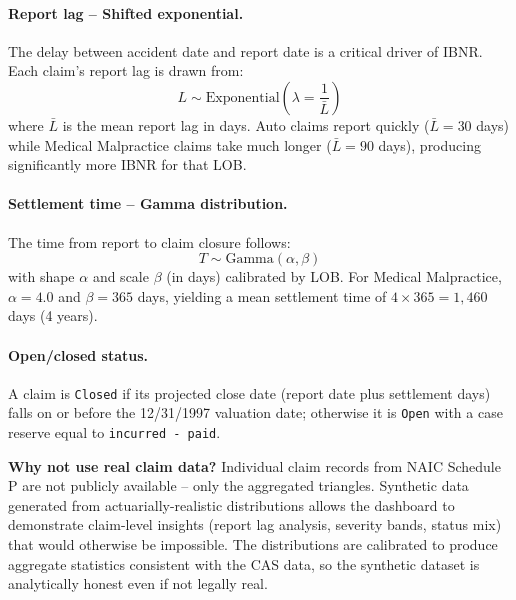 \paragraph{Report lag -- Shifted exponential.}
The delay between accident date and report date is a critical driver of IBNR.
Each claim's report lag is drawn from:
\begin{equation}
  L \sim \mathrm{Exponential}\!\left(\lambda = \frac{1}{\bar{L}}\right)
  \label{eq:report-lag}
\end{equation}
where $\bar{L}$ is the mean report lag in days.  Auto claims report quickly
($\bar{L} = 30$ days) while Medical Malpractice claims take much longer
($\bar{L} = 90$ days), producing significantly more IBNR for that LOB.

\paragraph{Settlement time -- Gamma distribution.}
The time from report to claim closure follows:
\begin{equation}
  T \sim \mathrm{Gamma}(\alpha, \beta)
  \label{eq:settlement-gamma}
\end{equation}
with shape $\alpha$ and scale $\beta$ (in days) calibrated by LOB.  For
Medical Malpractice, $\alpha = 4.0$ and $\beta = 365$ days, yielding a mean
settlement time of $4 \times 365 = 1{,}460$ days (4 years).

\paragraph{Open/closed status.}
A claim is \texttt{Closed} if its projected close date (report date plus
settlement days) falls on or before the 12/31/1997 valuation date; otherwise
it is \texttt{Open} with a case reserve equal to \texttt{incurred - paid}.

\begin{decisionbox}
\textbf{Why not use real claim data?}  Individual claim records from NAIC
Schedule P are not publicly available -- only the aggregated triangles.
Synthetic data generated from actuarially-realistic distributions allows the
dashboard to demonstrate claim-level insights (report lag analysis, severity
bands, status mix) that would otherwise be impossible.  The distributions are
calibrated to produce aggregate statistics consistent with the CAS data, so
the synthetic dataset is analytically honest even if not legally real.
\end{decisionbox}

